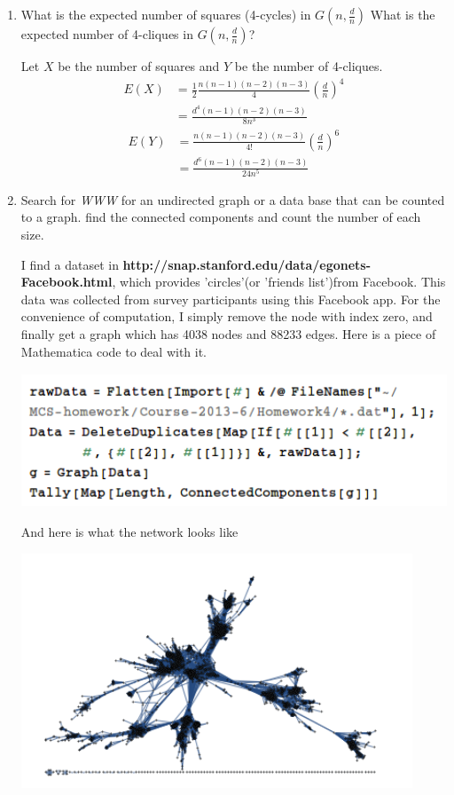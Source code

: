 \documentclass[a4paper, 12pt]{mcshw}
\begin{document}
\Letsmaketitle{}
\begin{enumerate}
    \item What is the expected number of squares (4-cycles) in $G(n, \frac{d}{n})$ What is the expected number of 4-cliques in $G(n, \frac{d}{n})$?
        \begin{solution}
            Let $X$ be the number of squares and $Y$ be the number of 4-cliques. 
            \begin{align*}
                E(X) &= \frac{1}{2}\frac{n(n - 1)(n - 2)(n - 3)}{4}(\frac{d}{n})^4\\
                &= \frac{d^4(n - 1)(n - 2)(n - 3)}{8n^3}
            \end{align*}
            \begin{align*}
                E(Y) &= \frac{n(n - 1)(n - 2)(n - 3)}{4!}(\frac{d}{n})^6\\
                &= \frac{d^6(n - 1)(n - 2)(n - 3)}{24n^5}
            \end{align*}
        \end{solution}
    \item Search for \textit{WWW} for an undirected graph or a data base that can be counted to a graph. find the connected components and count the number of each size.
        \pagebreak
        \begin{solution}
            I find a dataset in \textbf{http://snap.stanford.edu/data/egonets-Facebook.html}, which provides 'circles'(or 'friends list')from Facebook.  This data was collected from survey participants using this Facebook app. For the convenience of computation, I simply remove the node with index zero, and finally get a graph which has 4038 nodes and 88233 edges.
            Here is a piece of Mathematica code to deal with it.
            \begin{center}
                \includegraphics[height=4cm]{1.png}
            \end{center}
            And here is what the network looks like
            \begin{center}
                \includegraphics[height=7cm]{2.png}

\end{center}
\end{solution}
\end{enumerate}
\end{document}
